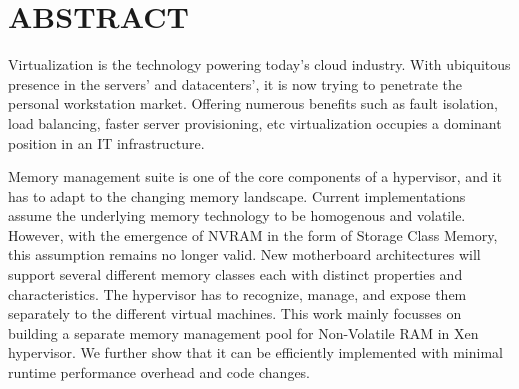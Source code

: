 %
%
%

\chapter*{ABSTRACT}

\pagestyle{plain} %
\setcounter{page}{2}

\indent 
Virtualization is the technology powering today's cloud industry. With ubiquitous presence in the servers' and datacenters', it is now trying to penetrate the personal workstation market. Offering numerous benefits such as fault isolation, load balancing, faster server provisioning, etc virtualization occupies a dominant position in an IT infrastructure. 

Memory management suite is one of the core components of a hypervisor, and it has to adapt to the changing memory landscape. Current implementations assume the underlying memory technology to be homogenous and volatile. However, with the emergence of NVRAM in the form of Storage Class Memory, this assumption remains no longer valid. New motherboard architectures will support several different memory classes each with distinct properties and characteristics. The hypervisor has to recognize, manage, and expose them separately to the different virtual machines. This work mainly focusses on building a separate memory management pool for Non-Volatile RAM in Xen hypervisor. We further show that it can be efficiently implemented with minimal runtime performance overhead and code changes.
